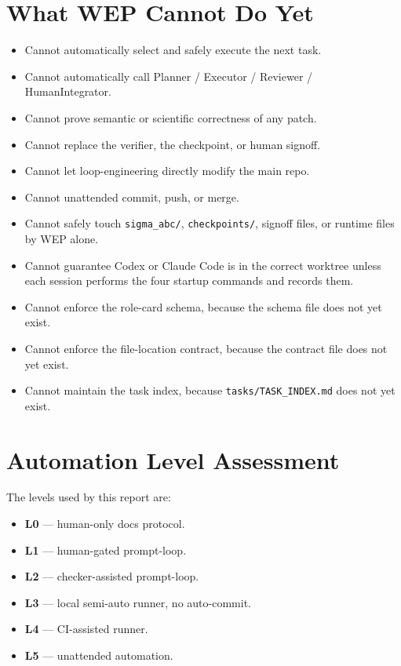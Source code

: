 \documentclass[11pt,a4paper]{article}
\begin{document}
\section{What WEP Cannot Do Yet}

\begin{itemize}[leftmargin=2em]
  \item Cannot automatically select and safely execute the next task.
  \item Cannot automatically call Planner / Executor / Reviewer /
        HumanIntegrator.
  \item Cannot prove semantic or scientific correctness of any patch.
  \item Cannot replace the verifier, the checkpoint, or human signoff.
  \item Cannot let loop-engineering directly modify the main repo.
  \item Cannot unattended commit, push, or merge.
  \item Cannot safely touch \texttt{sigma\_abc/}, \texttt{checkpoints/},
        signoff files, or runtime files by WEP alone.
  \item Cannot guarantee Codex or Claude Code is in the correct worktree
        unless each session performs the four startup commands and
        records them.
  \item Cannot enforce the role-card schema, because the schema file
        does not yet exist.
  \item Cannot enforce the file-location contract, because the contract
        file does not yet exist.
  \item Cannot maintain the task index, because
        \texttt{tasks/TASK\_INDEX.md} does not yet exist.
\end{itemize}

\section{Automation Level Assessment}

The levels used by this report are:

\begin{itemize}[leftmargin=2em]
  \item \textbf{L0} --- human-only docs protocol.
  \item \textbf{L1} --- human-gated prompt-loop.
  \item \textbf{L2} --- checker-assisted prompt-loop.
  \item \textbf{L3} --- local semi-auto runner, no auto-commit.
  \item \textbf{L4} --- CI-assisted runner.
  \item \textbf{L5} --- unattended automation.
\end{itemize}
\end{document}

